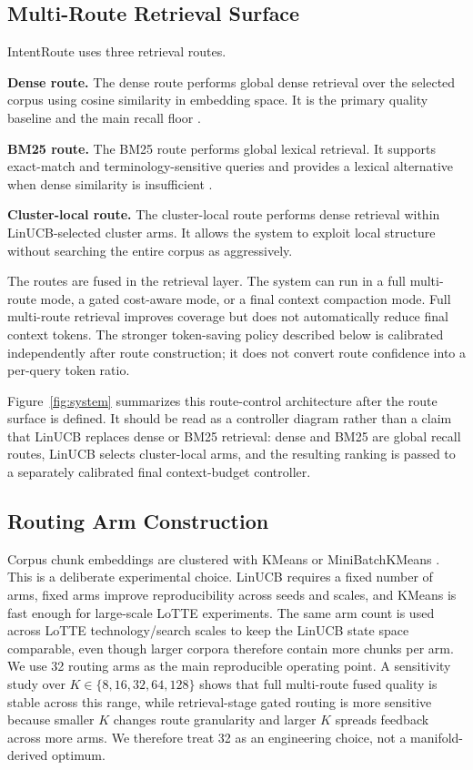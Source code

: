 \subsection{Multi-Route Retrieval Surface}
\label{sec:04-method:multi-route-retrieval-surface}

IntentRoute uses three retrieval routes.

\textbf{Dense route.} The dense route performs global dense retrieval over the selected corpus using cosine similarity in embedding space. It is the primary quality baseline and the main recall floor \citep{karpukhin2020dpr}.

\textbf{BM25 route.} The BM25 route performs global lexical retrieval. It supports exact-match and terminology-sensitive queries and provides a lexical alternative when dense similarity is insufficient \citep{robertson2009bm25}.

\textbf{Cluster-local route.} The cluster-local route performs dense retrieval within LinUCB-selected cluster arms. It allows the system to exploit local structure without searching the entire corpus as aggressively.

The routes are fused in the retrieval layer. The system can run in a full multi-route mode, a gated cost-aware mode, or a final context compaction mode. Full multi-route retrieval improves coverage but does not automatically reduce final context tokens. The stronger token-saving policy described below is calibrated independently after route construction; it does not convert route confidence into a per-query token ratio.

Figure~\ref{fig:system} summarizes this route-control architecture after the route surface is defined. It should be read as a controller diagram rather than a claim that LinUCB replaces dense or BM25 retrieval: dense and BM25 are global recall routes, LinUCB selects cluster-local arms, and the resulting ranking is passed to a separately calibrated final context-budget controller.

\subsection{Routing Arm Construction}
\label{sec:04-method:routing-arm-construction}

Corpus chunk embeddings are clustered with KMeans or MiniBatchKMeans \citep{macqueen1967kmeans,sculley2010minibatch}. This is a deliberate experimental choice. LinUCB requires a fixed number of arms, fixed arms improve reproducibility across seeds and scales, and KMeans is fast enough for large-scale LoTTE experiments. The same arm count is used across LoTTE technology/search scales to keep the LinUCB state space comparable, even though larger corpora therefore contain more chunks per arm. We use 32 routing arms as the main reproducible operating point. A sensitivity study over $K \in \{8,16,32,64,128\}$ shows that full multi-route fused quality is stable across this range, while retrieval-stage gated routing is more sensitive because smaller $K$ changes route granularity and larger $K$ spreads feedback across more arms. We therefore treat 32 as an engineering choice, not a manifold-derived optimum.

